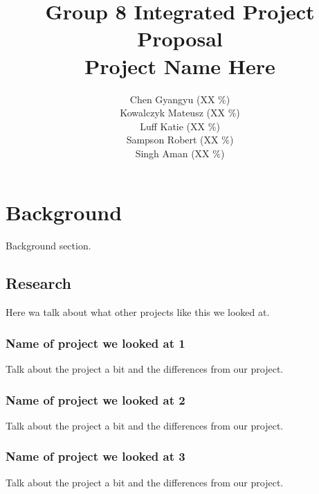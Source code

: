 \documentclass[10pt,a4paper,oneside]{report} \usepackage{graphicx}
\begin{document}
\title{Group 8 Integrated Project Proposal\\Project Name Here}

\author{
  Chen Gyangyu (XX \%)\\
  Kowalczyk Mateusz (XX \%)\\
  Luff Katie (XX \%)\\
  Sampson Robert (XX \%)\\
  Singh Aman (XX \%)\\ }
\maketitle
\section*{Background}
Background section.

\clearpage
\subsection*{Research}
Here wa talk about what other projects like this we looked at.


\subsubsection*{Name of project we looked at 1}
Talk about the project a bit and the differences from our project.


\subsubsection*{Name of project we looked at 2}
Talk about the project a bit and the differences from our project.

\subsubsection*{Name of project we looked at 3}
Talk about the project a bit and the differences from our project.



\end{document}
